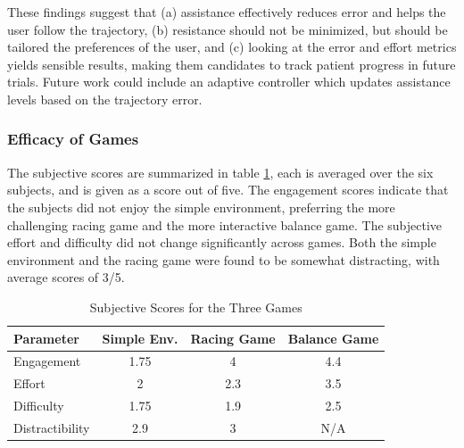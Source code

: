 \documentclass[12pt]{report}
\begin{document}

	These findings suggest that (a) assistance effectively reduces error and helps the user follow the trajectory, (b) resistance should not be minimized, but should be tailored the preferences of the user, and (c) looking at the error and effort metrics yields sensible results, making them candidates to track patient progress in future trials. Future work could include an adaptive controller which updates assistance levels based on the trajectory error. 


	
	\subsubsection{Efficacy of Games}
	
	
	The subjective scores are summarized in table \ref{tab:games}, each is averaged over the six subjects, and is given as a score out of five. The engagement scores indicate that the subjects did not enjoy the simple environment, preferring the more challenging racing game and the more interactive balance game. The subjective effort and difficulty did not change significantly across games. Both the simple environment and the racing game were found to be somewhat distracting, with average scores of 3/5. 
	
	
	\begin{table}[h] \label{tab:games}
	\centering \doublespacing
	\caption{Subjective Scores for the Three Games}
	\begin{tabular}{l c c c  }
	\toprule
	Parameter & Simple Env. & Racing Game & Balance Game \\
	\midrule
	\rowcolor{gray!10} Engagement & 1.75 & 4 & 4.4\\
	Effort & 2 & 2.3 & 3.5 \\
	\rowcolor{gray!10} Difficulty & 1.75 & 1.9 & 2.5   \\
	Distractibility & 2.9 & 3 & N/A \\
	\bottomrule
	\end{tabular}
	\end{table}	
	
\end{document}
